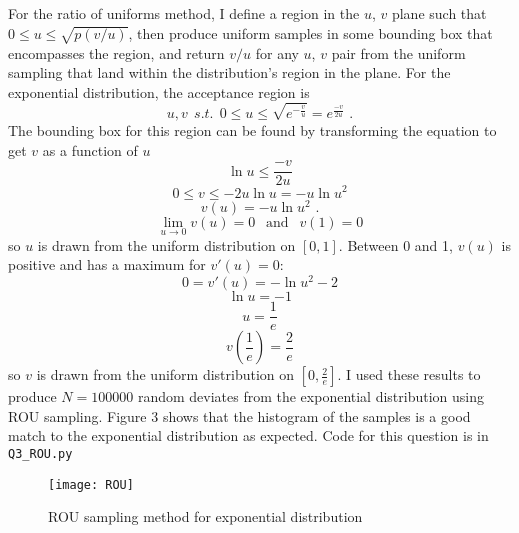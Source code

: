 \documentclass{article}
\newcommand{\<}[1]{\left\langle #1 \right\rangle }
\begin{document}
\section{}
For the ratio of uniforms method, I define a region in the $u$, $v$ plane such that $0 \leq u \leq \sqrt{p(v/u)}$, then produce uniform samples in some bounding box that encompasses the region, and return $v/u$ for any $u$, $v$ pair from the uniform sampling that land within the distribution's region in the plane. For the exponential distribution, the acceptance region is 
\[u,v \ \ s.t. \ \ 0 \leq u \leq \sqrt{e^{-\frac{v}{u}}} = e^{\frac{-v}{2u}} \text{ .}\]
The bounding box for this region can be found by transforming the equation to get $v$ as a function of $u$
\[ \ln{u} \leq \frac{-v}{2u} \]
\[0 \leq v \leq -2u\ln{u} = -u\ln{u^2}\]
\[v(u) = -u\ln{u^2} \text{ .}\]
\[\lim_{u\to 0}v(u) = 0 \ \ \text{ and } \ \ v(1) = 0\]
so $u$ is drawn from the uniform distribution on $[0,1]$. Between 0 and 1, $v(u)$ is positive and has a maximum for $v'(u) = 0$:
\[0 = v'(u) = -\ln{u^2} - 2\]
\[\ln{u} = -1\]
\[u = \frac{1}{e}\]
\[v\left(\frac{1}{e}\right) = \frac{2}{e}\]
so $v$ is drawn from the uniform distribution on $[0, \frac{2}{e}]$. I used these results to produce $N = 100000$ random deviates from the exponential distribution using ROU sampling. Figure 3 shows that the histogram of the samples is a good match to the exponential distribution as expected. Code for this question is in \texttt{Q3\_ROU.py}
\begin{figure}[h]
	\caption{ROU sampling method for exponential distribution}
	\centering
	\texttt{[image: ROU]}
\end{figure}






	
	
\end{document}
